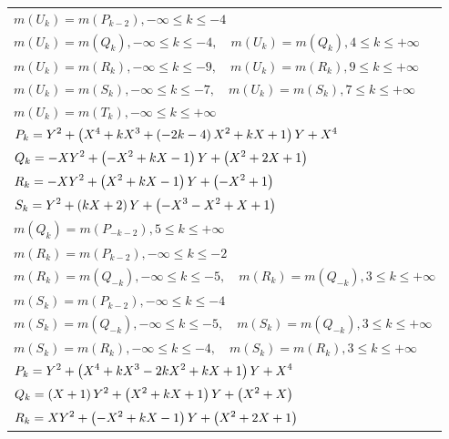 \documentclass{amsart}
\begin{document}
\begin{longtable}{|l|}
\(\displaystyle m(U_k) = m(P_{k
 - 2}),-\infty \leqslant k \leqslant -4\)\\
\(\displaystyle m(U_k) = m(Q_{k}),-\infty \leqslant k \leqslant -4,\quad m(U_k) = m(Q_{k}),4 \leqslant k \leqslant +\infty\)\\
\(\displaystyle m(U_k) = m(R_{k}),-\infty \leqslant k \leqslant -9,\quad m(U_k) = m(R_{k}),9 \leqslant k \leqslant +\infty\)\\
\(\displaystyle m(U_k) = m(S_{k}),-\infty \leqslant k \leqslant -7,\quad m(U_k) = m(S_{k}),7 \leqslant k \leqslant +\infty\)\\
\(\displaystyle m(U_k) = m(T_{k}),-\infty \leqslant k \leqslant +\infty\)\\
\hline
\(\displaystyle P_k=Y^2
 + \left(X^4
 + k\*X^3
 + \left(-2\*k
 - 4\right) \*X^2
 + k\*X
 + 1\right) \*Y
 + X^4\)\\
\(\displaystyle Q_k=-X\*Y^2
 + \left(-X^2
 + k\*X
 - 1\right) \*Y
 + \left(X^2
 + 2\*X
 + 1\right) \)\\
\(\displaystyle R_k=-X\*Y^2
 + \left(X^2
 + k\*X
 - 1\right) \*Y
 + \left(-X^2
 + 1\right) \)\\
\(\displaystyle S_k=Y^2
 + \left(k\*X
 + 2\right) \*Y
 + \left(-X^3
 - X^2
 + X
 + 1\right) \)\\
\(\displaystyle m(Q_k) = m(P_{-k
 - 2}),5 \leqslant k \leqslant +\infty\)\\
\(\displaystyle m(R_k) = m(P_{k
 - 2}),-\infty \leqslant k \leqslant -2\)\\
\(\displaystyle m(R_k) = m(Q_{-k}),-\infty \leqslant k \leqslant -5,\quad m(R_k) = m(Q_{-k}),3 \leqslant k \leqslant +\infty\)\\
\(\displaystyle m(S_k) = m(P_{k
 - 2}),-\infty \leqslant k \leqslant -4\)\\
\(\displaystyle m(S_k) = m(Q_{-k}),-\infty \leqslant k \leqslant -5,\quad m(S_k) = m(Q_{-k}),3 \leqslant k \leqslant +\infty\)\\
\(\displaystyle m(S_k) = m(R_{k}),-\infty \leqslant k \leqslant -4,\quad m(S_k) = m(R_{k}),3 \leqslant k \leqslant +\infty\)\\
\hline
\(\displaystyle P_k=Y^2
 + \left(X^4
 + k\*X^3
 - 2\*k\*X^2
 + k\*X
 + 1\right) \*Y
 + X^4\)\\
\(\displaystyle Q_k= \left(X
 + 1\right) \*Y^2
 + \left(X^2
 + k\*X
 + 1\right) \*Y
 + \left(X^2
 + X\right) \)\\
\(\displaystyle R_k=X\*Y^2
 + \left(-X^2
 + k\*X
 - 1\right) \*Y
 + \left(X^2
 + 2\*X
 + 1\right) \)\\

\end{longtable}
\end{document}
